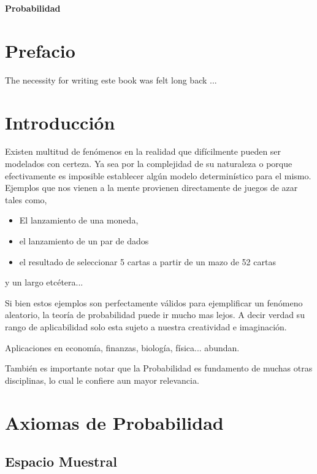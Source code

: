 \documentclass[a4paper,12pt,twoside]{book}
\begin{document}
\thispagestyle{empty}
\begin{center}
{\Huge\bf Probabilidad}%
\end{center}
\cleardoublepage
\chapter*{Prefacio}
The necessity for writing este book was felt long back ...
\cleardoublepage
\tableofcontents
\cleardoublepage
\chapter{Introducción}
Existen multitud de fenómenos en la realidad que difícilmente pueden ser modelados con certeza. Ya sea por la complejidad de su naturaleza o porque efectivamente es imposible establecer algún modelo determinístico para el mismo. Ejemplos que nos vienen a la mente provienen directamente de juegos de azar tales como, 

\begin{itemize}
	\item El lanzamiento de una moneda,
	\item el lanzamiento de un par de dados
	\item el resultado de seleccionar 5 cartas a partir de un mazo de 52 cartas
\end{itemize}

y un largo etcétera...

Si bien estos ejemplos son perfectamente válidos para ejemplificar un fenómeno aleatorio, la teoría de probabilidad puede ir mucho mas lejos. A decir verdad su rango de aplicabilidad solo esta sujeto a nuestra creatividad e imaginación.

Aplicaciones en economía, finanzas, biología, física... abundan.

También es importante notar que la Probabilidad es fundamento de muchas otras disciplinas, lo cual le confiere aun mayor relevancia.


\chapter{Axiomas de Probabilidad}

\section{Espacio Muestral} 
\end{document}
